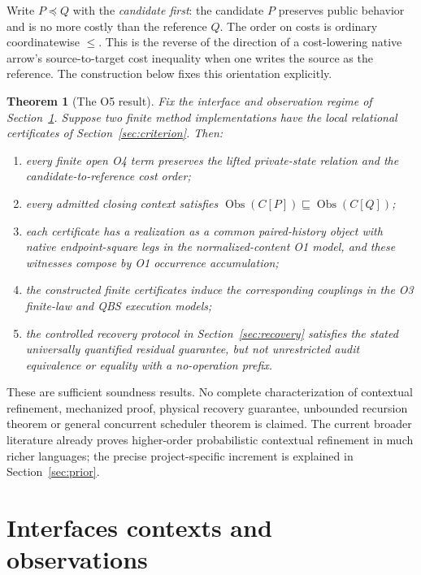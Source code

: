 \documentclass[11pt,a4paper]{article}
\newtheorem{theorem}{Theorem}[section]
\theoremstyle{definition}
\newcommand{\Obs}{\operatorname{Obs}}
\begin{document}
Write $P\preceq Q$ with the \emph{candidate first}: the candidate $P$
preserves public behavior and is no more costly than the reference $Q$.
The order on costs is ordinary coordinatewise $\le$. This is the reverse
of the direction of a cost-lowering native arrow's source-to-target
cost inequality when one writes the source as the reference. The
construction below fixes this orientation explicitly.

\begin{theorem}[The O5 result]\label{thm:main}
Fix the interface and observation regime of Section~\ref{sec:regime}.
Suppose two finite method implementations have the local relational
certificates of Section~\ref{sec:criterion}. Then:
\begin{enumerate}[label=\textup{(\roman*)}]
\item every finite open O4 term preserves the lifted private-state
relation and the candidate-to-reference cost order;
\item every admitted closing context satisfies
$\Obs(C[P])\sqsubseteq\Obs(C[Q])$;
\item each certificate has a realization as a common paired-history
object with native endpoint-square legs in the normalized-content O1
model, and these witnesses compose by O1 occurrence accumulation;
\item the constructed finite certificates induce the corresponding
couplings in the O3 finite-law and QBS execution models;
\item the controlled recovery protocol in Section~\ref{sec:recovery}
satisfies the stated universally quantified residual guarantee, but not
unrestricted audit equivalence or equality with a no-operation prefix.
\end{enumerate}
\end{theorem}
These are sufficient soundness results. No complete characterization of
contextual refinement, mechanized proof, physical recovery guarantee,
unbounded recursion theorem or general concurrent scheduler theorem is
claimed. The current broader literature already proves higher-order
probabilistic contextual refinement in much richer languages; the precise
project-specific increment is explained in Section~\ref{sec:prior}.

\section{Interfaces contexts and observations}\label{sec:regime}
\end{document}
